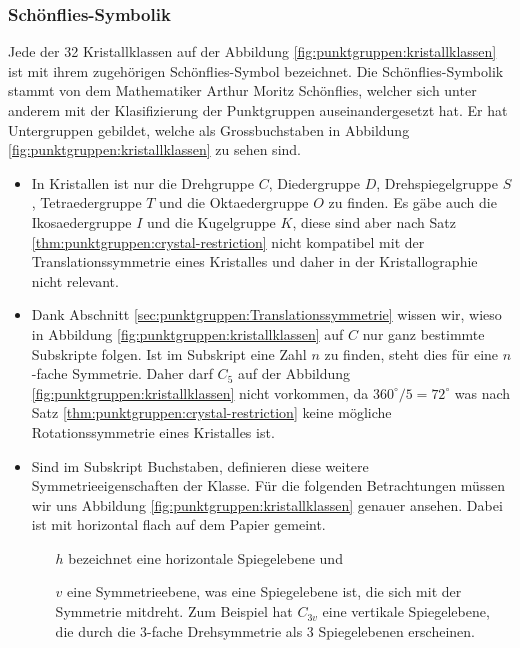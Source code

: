 \subsubsection{Schönflies-Symbolik}
%
Jede der 32 Kristallklassen auf der Abbildung \ref{fig:punktgruppen:kristallklassen} ist mit ihrem zugehörigen Schönflies-Symbol bezeichnet.
 Die Schönflies-Symbolik stammt von dem Mathematiker Arthur Moritz Schönflies, welcher sich unter anderem mit der Klasifizierung der Punktgruppen auseinandergesetzt hat.
%
 Er hat Untergruppen gebildet, welche als Grossbuchstaben in Abbildung \ref{fig:punktgruppen:kristallklassen} zu sehen sind.
 \begin{itemize}
   \item In Kristallen ist nur die Drehgruppe \(C\), Diedergruppe \(D\), Drehspiegelgruppe \(S\), Tetraedergruppe \(T\) und die Oktaedergruppe \(O\) zu finden.
%
%
%
%
%
	   Es gäbe auch die Ikosaedergruppe \(I\) und die Kugelgruppe \(K\), diese sind aber nach Satz \ref{thm:punktgruppen:crystal-restriction} nicht kompatibel mit der Translationssymmetrie eines Kristalles und daher in der Kristallographie nicht relevant.  
%
%
   \item Dank Abschnitt \ref{sec:punktgruppen:Translationssymmetrie} wissen wir, wieso in Abbildung \ref{fig:punktgruppen:kristallklassen} auf \(C\) nur ganz bestimmte Subskripte folgen.
     Ist im Subskript eine Zahl \(n\) zu finden, steht dies für eine \(n\)-fache Symmetrie.
     Daher darf \(C_5\) auf der Abbildung \ref{fig:punktgruppen:kristallklassen} nicht vorkommen, da \(360^\circ/5 =  72^\circ\) was nach Satz \ref{thm:punktgruppen:crystal-restriction} keine mögliche Rotationssymmetrie eines Kristalles ist.
   \item Sind im Subskript Buchstaben, definieren diese weitere Symmetrieeigenschaften der Klasse.
     Für die folgenden Betrachtungen müssen wir uns Abbildung \ref{fig:punktgruppen:kristallklassen} genauer ansehen.
     Dabei ist mit horizontal flach auf dem Papier gemeint.
     \begin{itemize}
       \item[\(h\)] bezeichnet eine horizontale Spiegelebene und 
       \item[\(v\)] eine Symmetrieebene, was eine Spiegelebene ist, die sich mit der Symmetrie mitdreht.
         Zum Beispiel hat \(C_{3v}\) eine vertikale Spiegelebene, die durch die 3-fache Drehsymmetrie als 3 Spiegelebenen erscheinen.

\end{itemize}
\end{itemize}
